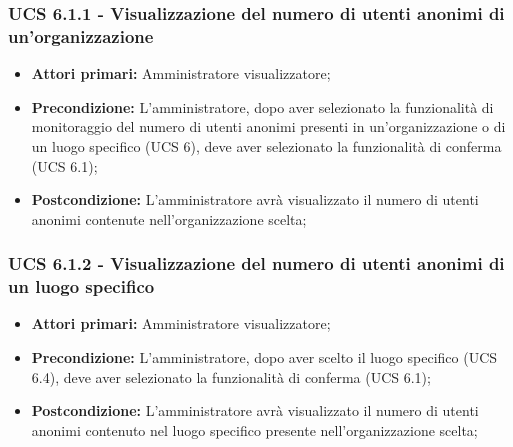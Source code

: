 \subsubsection{UCS 6.1.1 - Visualizzazione del numero di utenti anonimi di un'organizzazione}
\begin{itemize}
	\item \textbf{Attori primari:} Amministratore visualizzatore;
	\item \textbf{Precondizione:} L'amministratore, dopo aver selezionato la funzionalità di monitoraggio del numero di utenti anonimi presenti in un'organizzazione o di un luogo specifico (UCS 6), deve aver selezionato la funzionalità di conferma (UCS 6.1);
	\item \textbf{Postcondizione:} L'amministratore avrà visualizzato il numero di utenti anonimi contenute nell'organizzazione scelta;
\end{itemize}

\subsubsection{UCS 6.1.2 - Visualizzazione del numero di utenti anonimi di un luogo specifico}
\begin{itemize}
	\item \textbf{Attori primari:} Amministratore visualizzatore;
	\item \textbf{Precondizione:} L'amministratore, dopo aver scelto il luogo specifico (UCS 6.4), deve aver selezionato la funzionalità di conferma (UCS 6.1);
	\item \textbf{Postcondizione:} L'amministratore avrà visualizzato il numero di utenti anonimi contenuto nel luogo specifico presente nell'organizzazione scelta;
\end{itemize}




